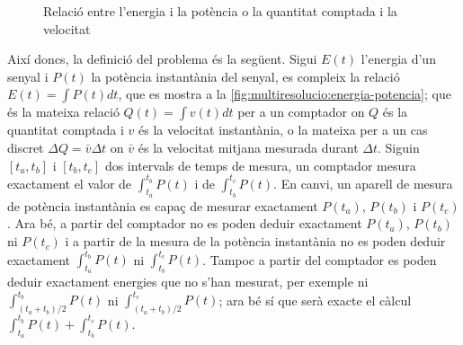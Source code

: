  



\begin{figure}[tp]
  \centering


      \caption{Relació entre l'energia i la potència o la quantitat
        comptada i la velocitat}
  \label{fig:multiresolucio:energia-potencia}
\end{figure}




Així doncs, la definició del problema és la següent.  Sigui $E(t)$
l'energia d'un senyal i $P(t)$ la potència instantània del senyal, es
compleix la relació $E(t)=\int P(t) dt$, que es mostra a la
\autoref{fig:multiresolucio:energia-potencia}; que és la mateixa
relació $Q(t)=\int v(t) dt$ per a un comptador on $Q$ és la quantitat
comptada i $v$ és la velocitat instantània, o la mateixa per a un cas
discret $\Delta Q = \bar{v} \Delta t$ on $\bar{v}$ és la velocitat
mitjana mesurada durant $\Delta t$. %
  Siguin
  $[t_a,t_b]$ i $[t_b,t_c]$ dos intervals de temps de mesura, un
  comptador mesura exactament el valor de $\int_{t_a}^{t_b} P(t)$ i de
  $\int_{t_b}^{t_c} P(t)$. En canvi, un aparell de mesura de potència
  instantània es capaç de mesurar exactament $P(t_a)$, $P(t_b)$ i
  $P(t_c)$. Ara bé, a partir del comptador no es poden deduir
  exactament $P(t_a)$, $P(t_b)$ ni $P(t_c)$ i a partir de la mesura de
  la potència instantània no es poden deduir exactament
  $\int_{t_a}^{t_b} P(t)$ ni $\int_{t_b}^{t_c} P(t)$. Tampoc a partir
  del comptador es poden deduir exactament energies que no s'han
  mesurat, per exemple ni $\int_{(t_a+t_b)/2}^{t_b} P(t)$ ni
  $\int_{(t_a+t_b)/2}^{t_c} P(t)$; ara bé sí que serà exacte el càlcul
  $\int_{t_a}^{t_b} P(t)+\int_{t_b}^{t_c} P(t)$.
  

